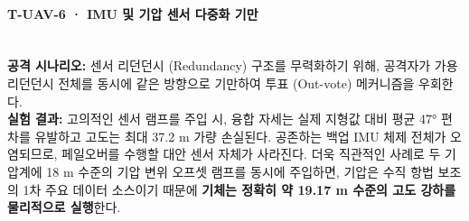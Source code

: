 \paragraph{\textbf{T-UAV-6 · IMU 및 기압 센서 다중화 기만}} ~\\
\textbf{공격 시나리오:} 센서 리던던시 (Redundancy) 구조를 무력화하기 위해, 공격자가 가용 리던던시 전체를 동시에 같은 방향으로 기만하여 투표 (Out-vote) 메커니즘을 우회한다.\\
\textbf{실험 결과:}
고의적인 센서 램프를 주입 시, 융합 자세는 실제 지형값 대비 평균 47° 편차를 유발하고 고도는 최대 37.2 m 가량 손실된다. 공존하는 백업 IMU 체제 전체가 오염되므로, 페일오버를 수행할 대안 센서 자체가 사라진다. 더욱 직관적인 사례로 두 기압계에 18 m 수준의 기압 변위 오프셋 램프를 동시에 주입하면, 기압은 수직 항법 보조의 1차 주요 데이터 소스이기 때문에 \textbf{기체는 정확히 약 19.17 m 수준의 고도 강하를 물리적으로 실행}한다.
%
